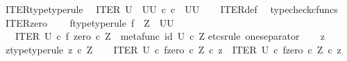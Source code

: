 \begin{isabellebody}
\isanewline
{}\isamarkupfalse%
\ ITER{\isacharunderscore}{\kern0pt}type{\isacharbrackleft}{\kern0pt}type{\isacharunderscore}{\kern0pt}rule{\isacharbrackright}{\kern0pt}{\isacharcolon}{\kern0pt}\isanewline
\ \ {\isachardoublequoteopen}ITER\ U\ {\isacharcolon}{\kern0pt}\ {\isacharparenleft}{\kern0pt}{\isacharparenleft}{\kern0pt}U\isactrlbsup U\isactrlesup {\isacharparenright}{\kern0pt}\ {\isasymtimes}\isactrlsub c\ {\isasymnat}\isactrlsub c{\isacharparenright}{\kern0pt}\ {\isasymrightarrow}\ {\isacharparenleft}{\kern0pt}U\isactrlbsup U\isactrlesup {\isacharparenright}{\kern0pt}{\isachardoublequoteclose}\isanewline
%
\isadelimproof
\ \ %
\endisadelimproof
%
\isatagproof
{}\isamarkupfalse%
\ ITER{\isacharunderscore}{\kern0pt}def\ \isamarkupfalse%
\ typecheck{\isacharunderscore}{\kern0pt}cfuncs%
\endisatagproof
{\isafoldproof}%
%
\isadelimproof
\isanewline
%
\endisadelimproof
\isanewline
{}\isamarkupfalse%
\ ITER{\isacharunderscore}{\kern0pt}zero{\isacharcolon}{\kern0pt}\ \isanewline
\ \ \ f{\isacharunderscore}{\kern0pt}type{\isacharbrackleft}{\kern0pt}type{\isacharunderscore}{\kern0pt}rule{\isacharbrackright}{\kern0pt}{\isacharcolon}{\kern0pt}\ {\isachardoublequoteopen}f\ {\isacharcolon}{\kern0pt}\ Z\ {\isasymrightarrow}\ {\isacharparenleft}{\kern0pt}U\isactrlbsup U\isactrlesup {\isacharparenright}{\kern0pt}{\isachardoublequoteclose}\isanewline
\ \ \ {\isachardoublequoteopen}ITER\ U\ {\isasymcirc}\isactrlsub c\ {\isasymlangle}f{\isacharcomma}{\kern0pt}\ zero\ {\isasymcirc}\isactrlsub c\ {\isasymbeta}\isactrlbsub Z\isactrlesub {\isasymrangle}\ {\isacharequal}{\kern0pt}\ metafunc\ {\isacharparenleft}{\kern0pt}id\ U{\isacharparenright}{\kern0pt}\ {\isasymcirc}\isactrlsub c\ {\isasymbeta}\isactrlbsub Z\isactrlesub {\isachardoublequoteclose}\isanewline
%
\isadelimproof
%
\endisadelimproof
%
\isatagproof
{}\isamarkupfalse%
{\isacharparenleft}{\kern0pt}etcs{\isacharunderscore}{\kern0pt}rule\ one{\isacharunderscore}{\kern0pt}separator{\isacharparenright}{\kern0pt}\isanewline
\ \ \isamarkupfalse%
\ z\ \isanewline
\ \ \isamarkupfalse%
\ z{\isacharunderscore}{\kern0pt}type{\isacharbrackleft}{\kern0pt}type{\isacharunderscore}{\kern0pt}rule{\isacharbrackright}{\kern0pt}{\isacharcolon}{\kern0pt}\ {\isachardoublequoteopen}z\ {\isasymin}\isactrlsub c\ Z{\isachardoublequoteclose}\isanewline
\ \ \isamarkupfalse%
\ {\isachardoublequoteopen}{\isacharparenleft}{\kern0pt}ITER\ U\ {\isasymcirc}\isactrlsub c\ {\isasymlangle}f{\isacharcomma}{\kern0pt}zero\ {\isasymcirc}\isactrlsub c\ {\isasymbeta}\isactrlbsub Z\isactrlesub {\isasymrangle}{\isacharparenright}{\kern0pt}\ {\isasymcirc}\isactrlsub c\ z\ {\isacharequal}{\kern0pt}\ ITER\ U\ {\isasymcirc}\isactrlsub c\ {\isasymlangle}f{\isacharcomma}{\kern0pt}zero\ {\isasymcirc}\isactrlsub c\ {\isasymbeta}\isactrlbsub Z\isactrlesub {\isasymrangle}\ {\isasymcirc}\isactrlsub c\ z{\isachardoublequoteclose}\isanewline

\end{isabellebody}
